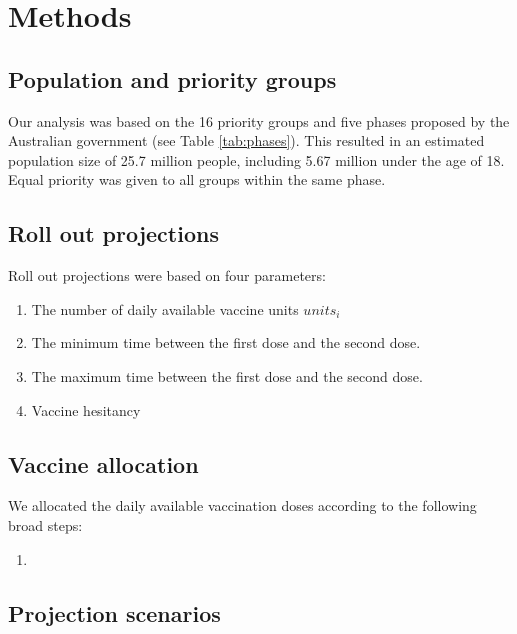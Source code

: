 \documentclass{article}
\begin{document}
\hypertarget{methods}{%
\section{Methods}\label{methods}}

\hypertarget{population-and-priority-groups}{%
\subsection{Population and priority
groups}\label{population-and-priority-groups}}

Our analysis was based on the 16 priority groups and five phases
proposed by the Australian government (see Table \ref{tab:phases}). This
resulted in an estimated population size of 25.7 million people,
including 5.67 million under the age of 18. Equal priority was given to
all groups within the same phase.

\hypertarget{roll-out-projections}{%
\subsection{Roll out projections}\label{roll-out-projections}}

Roll out projections were based on four parameters:

\begin{enumerate}
\def\labelenumi{\arabic{enumi}.}
\tightlist
\item
  The number of daily available vaccine units \(units_i\)
\item
  The minimum time between the first dose and the second dose.
\item
  The maximum time between the first dose and the second dose.
\item
  Vaccine hesitancy
\end{enumerate}

\hypertarget{vaccine-allocation}{%
\subsection{Vaccine allocation}\label{vaccine-allocation}}

We allocated the daily available vaccination doses according to the
following broad steps:

\begin{enumerate}
\def\labelenumi{\arabic{enumi}.}
\item
\end{enumerate}

\hypertarget{projection-scenarios}{%
\subsection{Projection scenarios}\label{projection-scenarios}}
\end{document}
